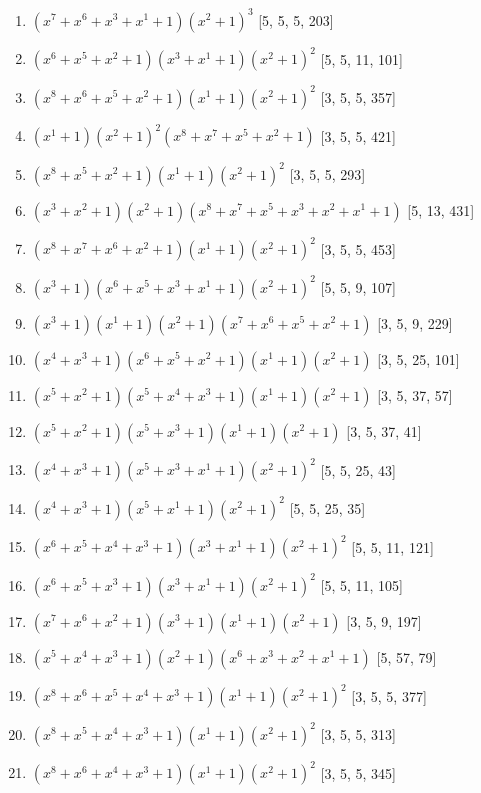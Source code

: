 \documentclass[10pt,twocolumn]{article}
\begin{document}
\begin{enumerate}
\item $(x^{7} + x^{6} + x^{3} + x^{1} + 1)(x^{2} + 1)^{3}$  [5, 5, 5, 203]
\item $(x^{6} + x^{5} + x^{2} + 1)(x^{3} + x^{1} + 1)(x^{2} + 1)^{2}$  [5, 5, 11, 101]
\item $(x^{8} + x^{6} + x^{5} + x^{2} + 1)(x^{1} + 1)(x^{2} + 1)^{2}$  [3, 5, 5, 357]
\item $(x^{1} + 1)(x^{2} + 1)^{2}(x^{8} + x^{7} + x^{5} + x^{2} + 1)$  [3, 5, 5, 421]
\item $(x^{8} + x^{5} + x^{2} + 1)(x^{1} + 1)(x^{2} + 1)^{2}$  [3, 5, 5, 293]
\item $(x^{3} + x^{2} + 1)(x^{2} + 1)(x^{8} + x^{7} + x^{5} + x^{3} + x^{2} + x^{1} + 1)$  [5, 13, 431]
\item $(x^{8} + x^{7} + x^{6} + x^{2} + 1)(x^{1} + 1)(x^{2} + 1)^{2}$  [3, 5, 5, 453]
\item $(x^{3} + 1)(x^{6} + x^{5} + x^{3} + x^{1} + 1)(x^{2} + 1)^{2}$  [5, 5, 9, 107]
\item $(x^{3} + 1)(x^{1} + 1)(x^{2} + 1)(x^{7} + x^{6} + x^{5} + x^{2} + 1)$  [3, 5, 9, 229]
\item $(x^{4} + x^{3} + 1)(x^{6} + x^{5} + x^{2} + 1)(x^{1} + 1)(x^{2} + 1)$  [3, 5, 25, 101]
\item $(x^{5} + x^{2} + 1)(x^{5} + x^{4} + x^{3} + 1)(x^{1} + 1)(x^{2} + 1)$  [3, 5, 37, 57]
\item $(x^{5} + x^{2} + 1)(x^{5} + x^{3} + 1)(x^{1} + 1)(x^{2} + 1)$  [3, 5, 37, 41]
\item $(x^{4} + x^{3} + 1)(x^{5} + x^{3} + x^{1} + 1)(x^{2} + 1)^{2}$  [5, 5, 25, 43]
\item $(x^{4} + x^{3} + 1)(x^{5} + x^{1} + 1)(x^{2} + 1)^{2}$  [5, 5, 25, 35]
\item $(x^{6} + x^{5} + x^{4} + x^{3} + 1)(x^{3} + x^{1} + 1)(x^{2} + 1)^{2}$  [5, 5, 11, 121]
\item $(x^{6} + x^{5} + x^{3} + 1)(x^{3} + x^{1} + 1)(x^{2} + 1)^{2}$  [5, 5, 11, 105]
\item $(x^{7} + x^{6} + x^{2} + 1)(x^{3} + 1)(x^{1} + 1)(x^{2} + 1)$  [3, 5, 9, 197]
\item $(x^{5} + x^{4} + x^{3} + 1)(x^{2} + 1)(x^{6} + x^{3} + x^{2} + x^{1} + 1)$  [5, 57, 79]
\item $(x^{8} + x^{6} + x^{5} + x^{4} + x^{3} + 1)(x^{1} + 1)(x^{2} + 1)^{2}$  [3, 5, 5, 377]
\item $(x^{8} + x^{5} + x^{4} + x^{3} + 1)(x^{1} + 1)(x^{2} + 1)^{2}$  [3, 5, 5, 313]
\item $(x^{8} + x^{6} + x^{4} + x^{3} + 1)(x^{1} + 1)(x^{2} + 1)^{2}$  [3, 5, 5, 345]

\end{enumerate}
\end{document}
